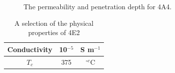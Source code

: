 \begin{figure}
\caption{The permeability  and penetration depth  for 4A4.}
\end{figure}

\begin{table}
\caption{A selection of the physical properties of 4E2}
\label{tab:4e2Prop}
\begin{center}
\begin{tabular}{c | c | c}
Conductivity  & 10$^{-5}$ & S m$^{-1}$\\ \hline
$T_{c}$ & 375 & $^{\circ c}$C \\
\end{tabular}
\end{center}
\end{table}

